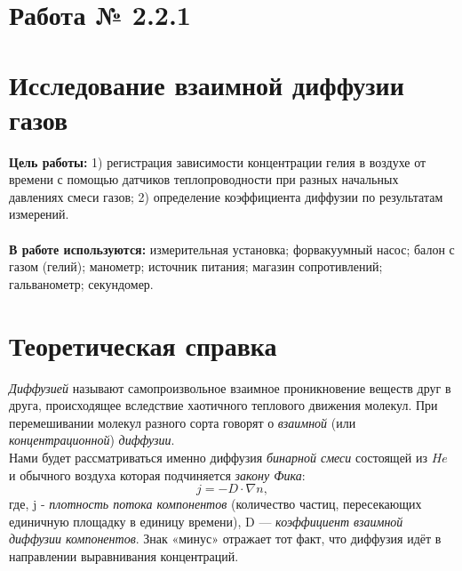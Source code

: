 \documentclass[12 pt, a4paper]{article}%
\begin{document}

\begin{center}
\section*{Работа № 2.2.1}
    \section*{Исследование взаимной диффузии газов}
\end{center}
\textbf{Цель работы:} 1) регистрация зависимости концентрации гелия в воздухе от времени с помощью датчиков теплопроводности при разных начальных давлениях смеси газов; 2) определение коэффициента диффузии по результатам измерений.
 \\ \\
\textbf{В работе используются:} измерительная установка; форвакуумный насос; балон с газом 	(гелий); манометр; источник питания; магазин сопротивлений; гальванометр; секундомер.


\section*{Теоретическая справка}

\textit{Диффузией} называют самопроизвольное взаимное проникновение веществ друг в друга, происходящее вследствие хаотичного теплового движения молекул. При перемешивании молекул разного сорта говорят о \textit{взаимной} (или \textit{концентрационной}) \textit{диффузии}. \\

Нами будет рассматриваться именно диффузия \textit{бинарной смеси} состоящей из $He$ и обычного воздуха которая подчиняется \textit{закону Фика}: 
\begin{equation} \label{law_of_Fick}
    j = - D \cdot \nabla n,
\end{equation} 
где,  j - \textit{плотность потока компонентов} (количество частиц, пересекающих единичную площадку в единицу времени), D — \textit{коэффициент взаимной диффузии компонентов}. Знак «минус» отражает тот факт, что диффузия идёт в направлении выравнивания концентраций. \\
\end{document}
